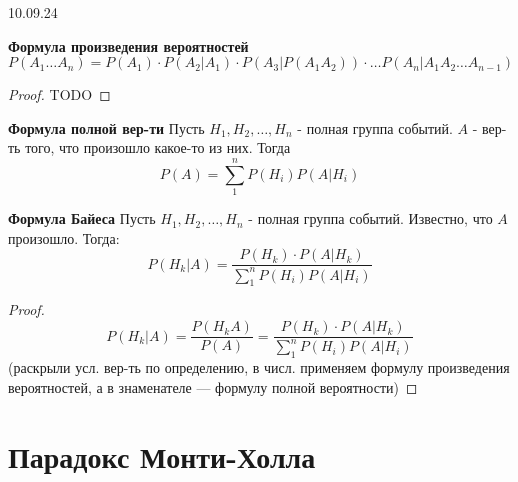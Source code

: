     \vspace{2cm}
    \begin{center}\large{10.09.24}\end{center}
    \begin{thm}
        \textbf{Формула произведения вероятностей}
        \begin{equation}
            P(A_{1}\dots A_{n}) = 
            P(A_{1})\cdot 
            P(A_{2}|A_{1})\cdot 
            P(A_{3} | P(A_{1} A_{2}))\cdot
            \dots
            P(A_{n} | A_{1}A_{2}\dots A_{n - 1})
        \end{equation}

        \begin{proof}
            TODO
        \end{proof}
    \end{thm}

    \begin{thm}
        \textbf{Формула полной вер-ти}
        Пусть \(H_{1}, H_{2}, \dots, H_{n}\) - полная группа событий. 
        \(A\) - вер-ть того, что произошло какое-то из них. Тогда
        \begin{equation}
            P(A) = \sum_{1}^{n} P(H_{i}) P(A|H_{i})
        \end{equation}
    \end{thm}


    \begin{thm}
        \textbf{Формула Байеса}
        Пусть \(H_{1}, H_{2}, \dots, H_{n}\) - полная группа событий. 
        Известно, что \(A\) произошло. Тогда:
        \begin{equation}
            P(H_{k} | A) = \frac{P(H_{k})\cdot P(A|H_{k})}{\sum_{1}^{n} P(H_{i}) P(A|H_{i})}
        \end{equation}
        \begin{proof}
            \begin{equation}
                P(H_{k} | A) = \frac{P(H_{k} A)}{P(A)} 
                = \frac{P(H_{k})\cdot P(A|H_{k})}{\sum_{1}^{n} P(H_{i}) P(A|H_{i})}
            \end{equation}
            (раскрыли усл. вер-ть по определению, в числ. применяем формулу произведения
            вероятностей, а в знаменателе — формулу полной вероятности)
        \end{proof}
    \end{thm}
    \section{Парадокс Монти-Холла}




